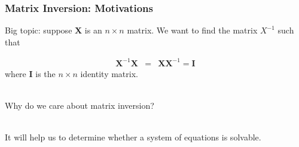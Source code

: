 \documentclass[handout]{beamer}
\numberwithin{equation}{section}
\begin{document}
\begin{frame}
\frametitle{Matrix Inversion: Motivations}

Big topic: suppose $\boldsymbol{X}$ is an $n \times n$ matrix.  We want to find the matrix $X^{-1}$ such that 

\begin{eqnarray}
\boldsymbol{X}^{-1} \boldsymbol{X} & = & \boldsymbol{X} \boldsymbol{X}^{-1} = \boldsymbol{I} \nonumber 
\end{eqnarray}
where $\boldsymbol{I}$ is the $n \times n$ identity matrix.  \\ \pause

\ \\Why do we care about matrix inversion? \pause

\ \\It will help us to determine whether a system of equations is solvable.



\end{frame}
\end{document}
